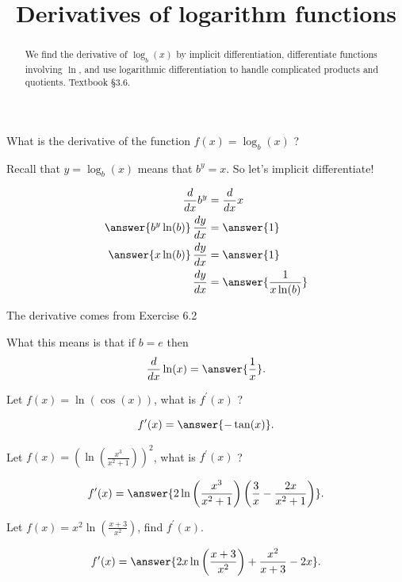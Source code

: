 \documentclass{ximera}
\title{Derivatives of logarithm functions}
\begin{document}
\begin{abstract}
We find the derivative of $\log_b(x)$ by implicit differentiation, differentiate functions involving $\ln$, and use logarithmic differentiation to handle complicated products and quotients. Textbook §3.6.
\end{abstract}
\maketitle

What is the derivative of the function $f(x)=\log _{b}(x)$ ?

Recall that $y=\log _{b}(x)$ means that $b^{y}=x$. So let's implicit differentiate!

\[
\begin{aligned}
\frac{d}{d x} b^{y} & =\frac{d}{d x} x \\
\answer{b^{y}\ln(b)}\,\frac{dy}{dx} & = \answer{1} \\
\answer{x\ln(b)}\,\frac{dy}{dx} & = \answer{1} \\
\frac{d y}{d x} & = \answer{\frac{1}{x\ln(b)}}
\end{aligned}
\]

The derivative comes from Exercise 6.2

What this means is that if $b=e$ then
\[
\frac{d}{dx}\ln(x)=\answer{\frac{1}{x}}.
\]

\begin{example}
\label{example:6-10}
Let $f(x)=\ln (\cos (x))$, what is $f^{\prime}(x)$ ?

\[
f^{\prime}(x)=\answer{-\tan(x)}.
\]
\end{example}

\begin{example}
\label{example:6-11}
Let $f(x)=\left(\ln \left(\frac{x^{3}}{x^{2}+1}\right)\right)^{2}$, what is $f^{\prime}(x)$ ?

\[
f^{\prime}(x)=\answer{2\ln\left(\frac{x^{3}}{x^{2}+1}\right)\left(\frac{3}{x}-\frac{2x}{x^{2}+1}\right)}.
\]
\end{example}

\begin{exercise}
\label{exercise:6-12}
Let $f(x)=x^{2} \ln \left(\frac{x+3}{x^{2}}\right)$, find $f^{\prime}(x)$.

\[
f^{\prime}(x)=\answer{2x\ln\left(\frac{x+3}{x^{2}}\right)+\frac{x^{2}}{x+3}-2x}.
\]
\end{exercise}
\end{document}

